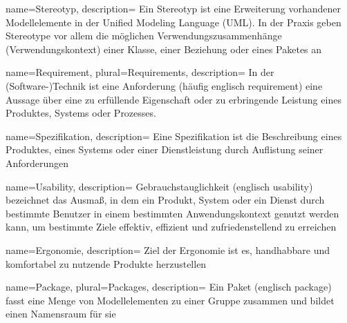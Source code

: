 {
  name=Stereotyp,
  description={
    Ein Stereotyp ist eine Erweiterung vorhandener Modellelemente in der Unified Modeling Language (UML). In der Praxis geben Stereotype vor allem die möglichen Verwendungszusammenhänge (Verwendungskontext) einer Klasse, einer Beziehung oder eines Paketes an}
}

 {
name=Requirement,
plural=Requirements,
description={
In der (Software-)Technik ist eine Anforderung (häufig englisch requirement) eine Aussage über eine zu erfüllende Eigenschaft oder zu erbringende Leistung eines Produktes, Systems oder Prozesses.}
}

{
  name=Spezifikation,
  description={
    Eine Spezifikation ist die Beschreibung eines Produktes, eines Systems oder einer Dienstleistung durch Auflistung seiner Anforderungen}
}

{
name=Usability,
description={
  Gebrauchstauglichkeit (englisch usability) bezeichnet das Ausmaß, in dem ein Produkt, System oder ein Dienst durch bestimmte Benutzer in einem bestimmten Anwendungskontext genutzt werden kann, um bestimmte Ziele effektiv, effizient und zufriedenstellend zu erreichen}
}

 {
name=Ergonomie,
description={
  Ziel der Ergonomie ist es, handhabbare und komfortabel zu nutzende Produkte herzustellen}
}

 {
name=Package,
plural=Packages,
description={
Ein Paket (englisch package) fasst eine Menge von Modellelementen zu einer Gruppe zusammen und bildet einen Namensraum für sie}
}
